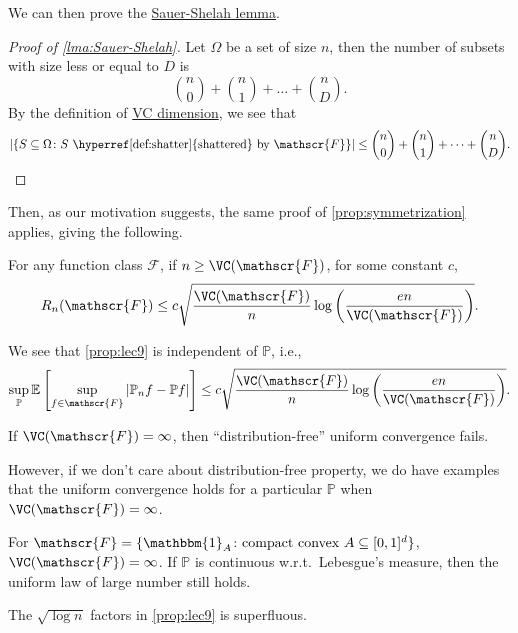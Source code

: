 We can then prove the \hyperref[lma:Sauer-Shelah]{Sauer-Shelah lemma}.

\begin{proof}[Proof of \autoref{lma:Sauer-Shelah}]
  Let \(\Omega \) be a set of size \(n\), then the number of subsets with size less or equal to \(D\) is
  \[
    \binom{n}{0} + \binom{n}{1} + \dots + \binom{n}{D}.
  \]
  By the definition of \hyperref[def:VC-dimension]{VC dimension}, we see that
  \[
    \vert \{ S \subseteq \Omega \colon S \text{ \hyperref[def:shatter]{shattered} by } \mathscr{F} \} \vert
    \leq \binom{n}{0} + \binom{n}{1} + \dots + \binom{n}{D}.
  \]
\end{proof}

Then, as our motivation suggests, the same proof of \autoref{prop:symmetrization} applies, giving the following.

\begin{proposition}\label{prop:lec9}
  For any function class \(\mathscr{F} \), if \(n \geq \VC(\mathscr{F} ) \), for some constant \(c\),
  \[
    R_n(\mathscr{F} ) \leq c \sqrt{\frac{\VC(\mathscr{F} ) }{n} \log \left( \frac{en}{\VC(\mathscr{F} ) } \right) }.
  \]
\end{proposition}

\begin{remark}
  We see that \autoref{prop:lec9} is independent of \(\mathbb{P} \), i.e.,
  \[
    \sup _{\mathbb{P} } \mathbb{E}_{}\left[\sup _{f\in \mathscr{F} } \vert \mathbb{P} _n f - \mathbb{P} f \vert \right] \leq c \sqrt{\frac{\VC(\mathscr{F} )}{n} \log \left( \frac{en}{\VC(\mathscr{F} )} \right) } .
  \]
\end{remark}

\begin{remark}
  If \(\VC(\mathscr{F} ) = \infty \), then ``distribution-free'' uniform convergence fails.
\end{remark}

However, if we don't care about distribution-free property, we do have examples that the uniform convergence holds for a particular \(\mathbb{P} \) when \(\VC(\mathscr{F} ) = \infty \).

\begin{eg}
  For \(\mathscr{F} = \{ \mathbbm{1}_{A} \colon \text{compact convex } A \subseteq [0, 1]^d \} \), \(\VC(\mathscr{F} ) = \infty \). If \(\mathbb{P} \) is continuous w.r.t.\ Lebesgue's measure, then the uniform law of large number still holds.
\end{eg}

\begin{remark}
  The \(\sqrt{\log n} \) factors in \autoref{prop:lec9} is superfluous.
\end{remark}

